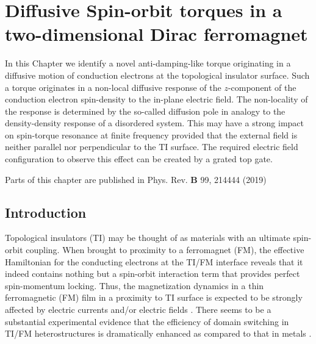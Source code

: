 \chapter{Diffusive Spin-orbit torques in a two-dimensional Dirac ferromagnet}\label{ch:diffusive}
In this Chapter we identify a novel anti-damping-like torque originating in a diffusive motion of conduction electrons at the topological insulator surface. Such a torque originates in a non-local diffusive response of the $z$-component of the conduction electron spin-density to the in-plane electric field. The non-locality of the response is determined by the so-called diffusion pole in analogy to the density-density response of a disordered system. This may have a strong impact on spin-torque resonance at finite frequency provided that the external field is neither parallel nor perpendicular to the TI surface. The required electric field configuration to observe this effect can be created by a grated top gate.

\vfill
Parts of this chapter are published in Phys. Rev. \textbf{B} 99, 214444 (2019) 
\clearpage

\section{Introduction} 
Topological insulators (TI) \cite{fu_topological_2007,moore_topological_2007,roy_topological_2009,hsieh_topological_2008} may be thought of as materials with an ultimate spin-orbit coupling. When brought to proximity to a ferromagnet (FM), the effective Hamiltonian for the conducting electrons at the TI/FM interface reveals that it indeed contains nothing but a spin-orbit interaction term that provides perfect spin-momentum locking. Thus, the magnetization dynamics in a thin ferromagnetic (FM) film in a proximity to TI surface is expected to be strongly affected by electric currents and/or electric fields \cite{qi_fractional_2008}. There seems to be a substantial experimental evidence that the efficiency of domain switching in TI/FM heterostructures is dramatically enhanced as compared to that in metals \cite{mellnik_spin-transfer_2014,wang_SOT_BiSe_2014,fan_magnetization_2014,Fan_SOT_TI_2016,Yasuda_SOT_BiSbTe_2017,Cha2018}. 

